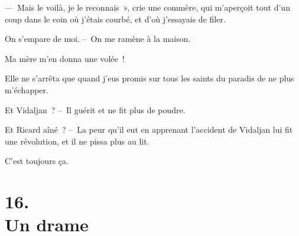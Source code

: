 \documentclass[french,twoside]{book} %
\begin{document}
— Mais le voilà, je le reconnais », crie une commère, qui m’aperçoit tout d’un coup dans le coin où j’étais courbé, et d’où j’essayais de filer.\par
On s’empare de moi. – On me ramène à la maison.\par
Ma mère m’en donna une volée !\par
Elle ne s’arrêta que quand j’eus promis sur tous les saints du paradis de ne plus m’échapper.\par
\bigbreak
\noindent Et Vidaljan ? – Il guérit et ne fit plus de poudre.\par
Et Ricard aîné ? – La peur qu’il eut en apprenant l’accident de Vidaljan lui fit une révolution, et il ne pissa plus au lit.\par
C’est toujours ça.
\section[{16. Un drame}]{16. \\
Un drame}\renewcommand{\leftmark}{16. \\
Un drame}
\end{document}
